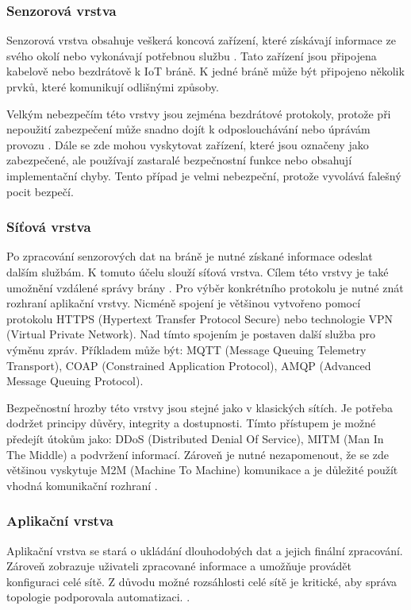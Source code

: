  \subsubsection{Senzorová vrstva}
 Senzorová vrstva obsahuje veškerá koncová zařízení, které získávají informace ze svého
 okolí nebo vykonávají potřebnou službu \cite{secFramework}. Tato zařízení jsou připojena
 kabelově nebo bezdrátově k IoT bráně. K jedné bráně může být připojeno několik
 prvků, které komunikují odlišnými způsoby.
 
 Velkým nebezpečím této vrstvy jsou zejména bezdrátové protokoly, protože při nepoužití
 zabezpečení může snadno dojít k odposlouchávání nebo úprávám provozu \cite{iotSurvey}.
 Dále se zde mohou vyskytovat zařízení, které jsou označeny jako zabezpečené, 
 ale používají zastaralé bezpečnostní funkce nebo obsahují implementační chyby. 
 Tento případ je velmi nebezpeční, protože vyvolává falešný pocit bezpečí.
 
 \subsubsection{Síťová vrstva}
 Po zpracování senzorových dat na bráně je nutné získané informace odeslat dalším
 službám. K tomuto účelu slouží síťová vrstva. Cílem této vrstvy je také umožnění 
 vzdálené správy brány \cite{secFramework}. Pro výběr konkrétního protokolu je 
 nutné znát rozhraní aplikační vrstvy. Nicméně spojení je většinou vytvořeno
 pomocí protokolu HTTPS (Hypertext Transfer Protocol Secure) nebo technologie
 VPN (Virtual Private Network). Nad tímto spojením je postaven další služba pro 
 výměnu zpráv. Příkladem může být: MQTT (Message Queuing Telemetry Transport),
 COAP (Constrained Application Protocol),
 AMQP (Advanced Message Queuing Protocol).
 
 Bezpečnostní hrozby této vrstvy jsou stejné jako v klasických sítích. Je potřeba
 dodržet principy důvěry, integrity a dostupnosti. Tímto přístupem je možné
 předejít útokům jako: DDoS (Distributed Denial Of Service),
 MITM (Man In The Middle) a podvržení informací. Zároveň je nutné
 nezapomenout, že se zde většinou vyskytuje M2M (Machine To Machine)
 komunikace a je důležité použít 
 vhodná komunikační rozhraní \cite{iotSurvey}.
 
 \subsubsection{Aplikační vrstva}
 Aplikační vrstva se stará o ukládání dlouhodobých dat a jejich finální zpracování. 
 Zároveň zobrazuje uživateli zpracované informace a umožňuje provádět konfiguraci
 celé sítě. Z důvodu možné rozsáhlosti celé sítě je kritické, aby správa
 topologie podporovala automatizaci. \cite{secFramework}.
 

